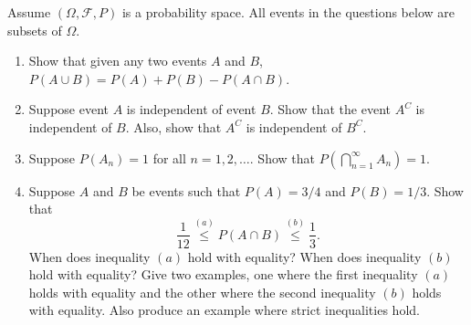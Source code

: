 \documentclass[12pt]{article}
\begin{document}
Assume $(\Omega,\mathcal{F},P)$ is a probability space. All events in the questions below are subsets of $\Omega$.
\begin{enumerate}
\item Show that given any two events $A$ and $B$, $P(A \cup B) = P(A) + P(B) - P(A \cap B)$.
\item Suppose event $A$ is independent of event $B$. Show that the event $A^C$ is independent of $B$. Also, show that $A^C$ is independent of $B^C$.
\item Suppose $P(A_n)=1$ for all $n=1,2,\ldots$. Show that $P\left(\bigcap\limits_{n=1}^\infty A_n\right)  = 1$.
\item Suppose $A$ and $B$ be events such that $P(A)=3/4$ and $P(B)=1/3$. Show that
\[
\frac{1}{12} \stackrel{(a)}{\le} P(A \cap B) \stackrel{(b)}{\le} \frac{1}{3}.
\]
When does inequality $(a)$ hold with equality? When does inequality $(b)$ hold with equality? Give two examples, one where the first inequality $(a)$ holds with equality and the other where the second inequality $(b)$ holds with equality. Also produce an example where strict inequalities hold.
\end{enumerate}
\end{document}
